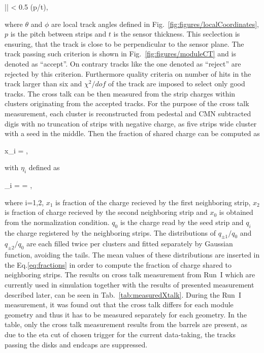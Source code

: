 {
|\theta {}\phi| < 0.5 \times (p/t),
}

where $\theta$ and $\phi$ are local track angles defined in Fig.~\ref{fig:figures/localCoordinates}, $p$ is the pitch between strips and $t$ is the sensor thickness. This seclection is ensuring, that the track is close to be perpendicular to the sensor plane. The track passing such criterion is shown in Fig.~\ref{fig:figures/moduleCT} and is denoted as ``accept''. On contrary tracks like the one denoted as ``reject'' are rejected by this criterion. Furthermore quality criteria on number of hits in the track larger than six and $\chi^{2}/dof$ of the track are imposed to select only good tracks. The cross talk can be then measured from the strip charges within clusters originating from the accepted tracks. For the purpose of the cross talk measurement, each cluster is reconstructed from pedestal and CMN subtracted digis with no truncation of strips with negative charge, as five strips wide cluster with a seed in the middle. Then the fraction of shared charge can be computed as


{
x_{i} =  ,
}

with $\eta_{i}$ defined as

{
\eta_{\pm i} =  =  ,
}

where i=1,2, $x_{1}$ is fraction of the charge recieved by the first neighboring strip,  $x_{2}$ is fraction of charge recieved by the second neighboring strip and $x_{0}$ is obtained from the normalization condition. $q_{0}$ is the charge read by the seed strip and $q_{i}$ the charge registered by the neighboring strips. The distributions of $q_{\pm 1}/q_{0}$ and $q_{\pm 2}/q_{0}$ are each filled twice per clusters and fitted separately by Gaussian function, avoiding the tails. The mean values of these distributions are inserted in the Eq.\ref{eq:fractions} in order to compute the fraction of charge shared to neighboring strips. The results on cross talk measurement from Run~I which are currently used in simulation together with the results of presented measurement described later, can be seen in Tab.~\ref{tab:measuredXtalk}. During the Run~I measurement, it was found out that the cross talk differs for each module geometry and thus it has to be measured separately for each geometry. In the table, only the cross talk measurement results from the barrels are present, as due to the eta cut of chosen trigger for the current data-taking, the tracks passing the disks and endcaps are suppressed. 

